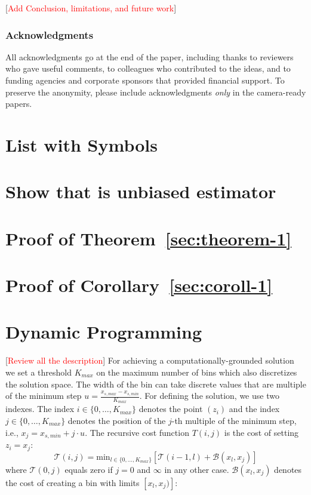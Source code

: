 \documentclass[twoside]{article}
\newcommand{\todo}[1]{[\textcolor{red}{#1}]}
\begin{document}
\todo{Add Conclusion, limitations, and future work}

\subsubsection*{Acknowledgments}
All acknowledgments go at the end of the paper, including thanks to reviewers who gave useful comments, to colleagues who contributed to the ideas, and to funding agencies and corporate sponsors that provided financial support. 
To preserve the anonymity, please include acknowledgments \emph{only} in the camera-ready papers.



\appendix

\section{List with Symbols}
\label{sec:list-with-symbols}

\section{Show that is unbiased estimator}
\label{sec:proof-1}

\section{Proof of Theorem~\ref{sec:theorem-1}}
\label{sec:proof-of-3-1}

\section{Proof of Corollary~\ref{sec:coroll-1}}
\label{sec:proof-of-coroll}

\section{Dynamic Programming}
\label{sec:dynamic-programming}

\todo{Review all the description}
For achieving a computationally-grounded solution we set a threshold
\(K_{max}\) on the maximum number of bins which also discretizes the
solution space. The width of the bin can take discrete values that are
multiple of the minimum step
\(u = \frac{x_{s, max} - x_{s, min}}{K_{max}}\). For defining the
solution, we use two indexes. The index
\(i \in \{0, \ldots, K_{max}\}\) denotes the point \((z_i)\) and the
index \(j \in \{0, \ldots, K_{max}\} \) denotes the position of the
\(j\)-th multiple of the minimum step, i.e., 
\(x_j = x_{s,min} + j \cdot u\). The recursive cost function
\(T(i,j)\) is the cost of setting \(z_i=x_j\):
\begin{equation}
  \label{eq:recursive_cost}
  \mathcal{T}(i,j) = \mathrm{min}_{l \in \{0, \ldots, K_{max}\}} \left [ \mathcal{T}(i-1, l) + \mathcal{B}(x_l, x_j) \right ]
\end{equation}
%
where \(\mathcal{T}(0,j)\) equals zero if \(j=0\) and \(\infty\) in
any other case. \(\mathcal{B}(x_l, x_j)\) denotes the cost of creating a bin
with limits \([x_l, x_j)]\):
\end{document}
